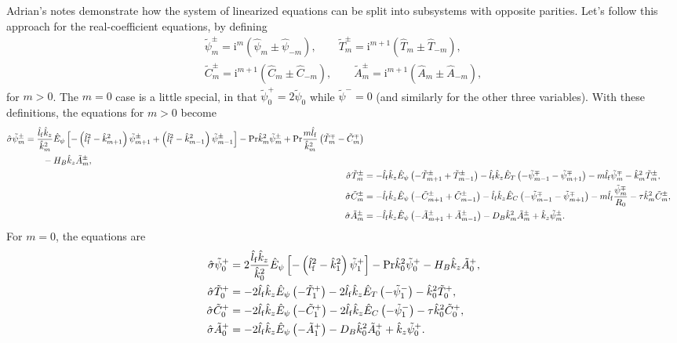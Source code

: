 \documentclass{article}
\newcommand{\shat}{\hat{\sigma}}
\newcommand{\phat}{\hat{\psi}}
\newcommand{\That}{\hat{T}}
\newcommand{\Chat}{\hat{C}}
\newcommand{\Ahat}{\hat{A}}
\newcommand{\ptil}{\tilde{\psi}}
\newcommand{\Ttil}{\tilde{T}}
\newcommand{\Ctil}{\tilde{C}}
\newcommand{\Atil}{\tilde{A}}
\newcommand{\khat}{\hat{k}}
\newcommand{\lhatf}{\hat{l}_{\rm f}}
\newcommand{\Prd}{\mathrm{Pr}}
\newcommand{\Rz}{R_{0}}
\newcommand{\HB}{H_{B}}
\newcommand{\DB}{D_{B}}
\newcommand{\EhatT}{\hat{E}_{T}}
\newcommand{\EhatC}{\hat{E}_{C}}
\newcommand{\Ehatp}{\hat{E}_{\psi}}
\newcommand{\ii}{\mathrm{i}}
\begin{document}
Adrian's notes demonstrate how the system of linearized equations can
be split into subsystems with opposite parities. Let's
follow this approach for the real-coefficient equations, by defining
%
\begin{multline}
  \ptil_m^{\pm} = \ii^m \left( \phat_m \pm \phat_{-m} \right), \qquad
  \Ttil_m^{\pm} = \ii^{m+1} \left( \That_m \pm \That_{-m} \right), \\
  \Ctil_m^{\pm} = \ii^{m+1} \left( \Chat_m \pm \Chat_{-m} \right), \qquad
  \Atil_m^{\pm} = \ii^{m+1} \left( \Ahat_m \pm \Ahat_{-m} \right),
\end{multline}
%
for $m > 0$. The $m=0$ case is a little special, in that
$\ptil_{0}^{+} = 2 \ptil_{0}$ while $\ptil^{-} = 0$ (and similarly for
the other three variables). With these definitions, the equations for
$m > 0$ become
%
\begin{align}
  \begin{split}
  \shat \ptil_{m}^{\pm} &=
  \frac{\lhatf \khat_z}{\khat^2_m} \Ehatp \left[
    - \left( \lhatf^2 - \khat^2_{m+1} \right) \ptil_{m+1}^{\pm} 
    + \left( \lhatf^2 - \khat^2_{m-1} \right) \ptil_{m-1}^{\pm}
    \right]
  - \Prd \khat^2_m \ptil_m^{\pm}
  + \Prd \frac{m \lhatf}{\khat_m^2} \left( \Ttil_m^{\mp} - \Ctil_m^{\mp} \right) \\
  & \qquad - \HB \khat_z \Atil_m^{\pm},
  \end{split} \\
  \shat \Ttil_m^{\pm} &=
  - \lhatf \khat_z \Ehatp \left( - \Ttil_{m+1}^{\pm} + \Ttil_{m-1}^{\pm} \right)
  - \lhatf \khat_z \EhatT \left( - \ptil_{m-1}^{\mp} - \ptil_{m+1}^{\mp} \right)
  - m \lhatf \ptil_m^{\mp}
  - \khat^2_m \Ttil_m^{\pm}, \\
  \shat \Ctil_m^{\pm} &=
  - \lhatf \khat_z \Ehatp \left( - \Ctil_{m+1}^{\pm} + \Ctil_{m-1}^{\pm} \right)
  - \lhatf \khat_z \EhatC \left( - \ptil_{m-1}^{\mp} - \ptil_{m+1}^{\mp} \right)
  - m \lhatf \frac{\ptil_m^{\mp}}{\Rz}
  - \tau \khat^2_m \Ctil_m^{\pm}, \\
  \shat \Atil_m^{\pm} &=
  - \lhatf \khat_z \Ehatp \left( - \Atil_{m+1}^{\pm} + \Atil_{m-1}^{\pm} \right)
  - \DB \khat^2_m \Atil_m^{\pm}
  + \khat_z \ptil_m^{\pm}.
\end{align}
%
For $m = 0$, the equations are
%
\begin{align}
  \shat \ptil_{0}^{+} &=
  2 \frac{\lhatf \khat_z}{\khat^2_0} \Ehatp \left[
    - \left( \lhatf^2 - \khat^2_{1} \right) \ptil_{1}^{+} 
    \right]
  - \Prd \khat^2_0 \ptil_0^{+}
  - \HB \khat_z \Atil_0^{+},
  \\ 
  \shat \Ttil_0^{+} &=
  - 2 \lhatf \khat_z \Ehatp \left( - \Ttil_{1}^{+} \right)
  - 2 \lhatf \khat_z \EhatT \left( - \ptil_{1}^{-} \right)
  - \khat^2_0 \Ttil_0^{+}, \\
  \shat \Ctil_0^{+} &=
  - 2 \lhatf \khat_z \Ehatp \left( - \Ctil_{1}^{+} \right)
  - 2 \lhatf \khat_z \EhatC \left( - \ptil_{1}^{-} \right)
  - \tau \khat^2_0 \Ctil_0^{+}, \\
  \shat \Atil_0^{+} &=
  - 2 \lhatf \khat_z \Ehatp \left( - \Atil_{1}^{+} \right)
  - \DB \khat^2_0 \Atil_0^{+}
  + \khat_z \ptil_0^{+}.
\end{align}
\end{document}
